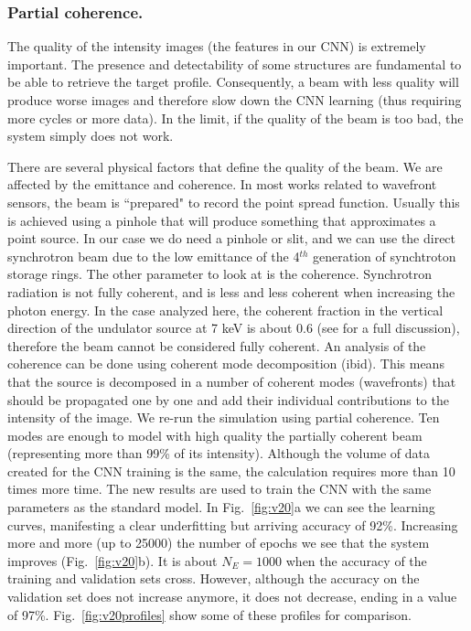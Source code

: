\documentclass{iucr}
\begin{document}


\subsubsection{Partial coherence.}
The quality of the intensity images (the features in our CNN) is extremely important. The presence and detectability of some structures are fundamental to be able to retrieve the target profile. Consequently, a beam with less quality will produce worse images and therefore slow down the CNN learning (thus requiring more cycles or more data). In the limit, if the quality of the beam is too bad, the system simply does not work.  

There are several physical factors that define the quality of the beam. We are affected by the emittance and coherence. In most works related to wavefront sensors, the beam is ``prepared" to record the point spread function. Usually this is achieved using a pinhole that will produce something that approximates a point source. In our case we do need a pinhole or slit, and we can use the direct synchrotron beam due to the low emittance of the 4$^{th}$ generation of synchtroton storage rings. The other parameter to look at is the coherence. Synchrotron radiation is not fully coherent, and is less and less coherent when increasing the photon energy. In the case analyzed here, the coherent fraction in the vertical direction of the undulator source at 7 keV is about 0.6 (see \cite{SanchezdelRio:ay5600} for a full discussion), therefore the beam cannot be considered fully coherent. An analysis of the coherence can be done using coherent mode decomposition (ibid). This means that the source is decomposed in a number of coherent modes (wavefronts) that should be propagated one by one and add their individual contributions to the intensity of the image. We re-run the simulation using partial coherence. Ten modes are enough to model with high quality the partially coherent beam (representing more than 99\% of its intensity). Although the volume of data created for the CNN training is the same, the calculation requires more than 10 times more time. The new results are used to train the CNN with the same parameters as the standard model. In Fig.~\ref{fig:v20}a we can see the learning curves, manifesting a clear underfitting but arriving accuracy of 92\%. Increasing more and more (up to 25000) the number of epochs we see that the system improves (Fig.~\ref{fig:v20}b). It is about $N_E=1000$ when the accuracy of the training and validation sets cross. However, although the accuracy on the validation set does not increase anymore, it does not decrease, ending in a value of 97\%. Fig.~\ref{fig:v20profiles} show some of these profiles for comparison.
\end{document}
